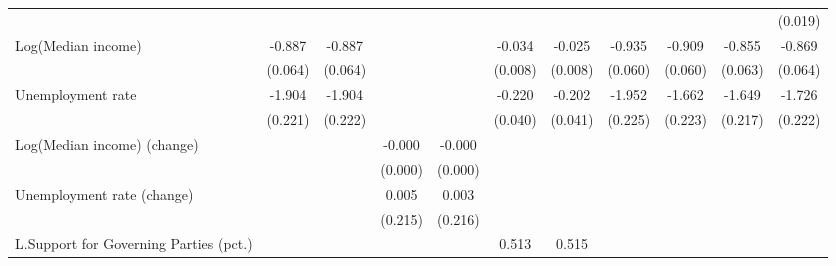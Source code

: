\documentclass[preview,12pt,varwidth]{standalone}
\begin{document}
\begin{sidewaystable}[htbp]
\begin{tabular}{l*{10}{c}}
                    &                    &                    &                    &                    &                    &                    &                    &                    &                    &     (0.019)        \\
[1em]
Log(Median income)  &      -0.887\sym{**}&      -0.887\sym{**}&                    &                    &      -0.034\sym{**}&      -0.025\sym{**}&      -0.935\sym{**}&      -0.909\sym{**}&      -0.855\sym{**}&      -0.869\sym{**}\\
                    &     (0.064)        &     (0.064)        &                    &                    &     (0.008)        &     (0.008)        &     (0.060)        &     (0.060)        &     (0.063)        &     (0.064)        \\
[1em]
Unemployment rate   &      -1.904\sym{**}&      -1.904\sym{**}&                    &                    &      -0.220\sym{**}&      -0.202\sym{**}&      -1.952\sym{**}&      -1.662\sym{**}&      -1.649\sym{**}&      -1.726\sym{**}\\
                    &     (0.221)        &     (0.222)        &                    &                    &     (0.040)        &     (0.041)        &     (0.225)        &     (0.223)        &     (0.217)        &     (0.222)        \\
[1em]
Log(Median income) (change)&                    &                    &      -0.000\sym{**}&      -0.000\sym{**}&                    &                    &                    &                    &                    &                    \\
                    &                    &                    &     (0.000)        &     (0.000)        &                    &                    &                    &                    &                    &                    \\
[1em]
Unemployment rate (change)&                    &                    &       0.005        &       0.003        &                    &                    &                    &                    &                    &                    \\
                    &                    &                    &     (0.215)        &     (0.216)        &                    &                    &                    &                    &                    &                    \\
[1em]
L.Support for Governing Parties (pct.)&                    &                    &                    &                    &       0.513\sym{**}&       0.515\sym{**}&                    &                    &                    &                    \\

\end{tabular}
\end{sidewaystable}
\end{document}

